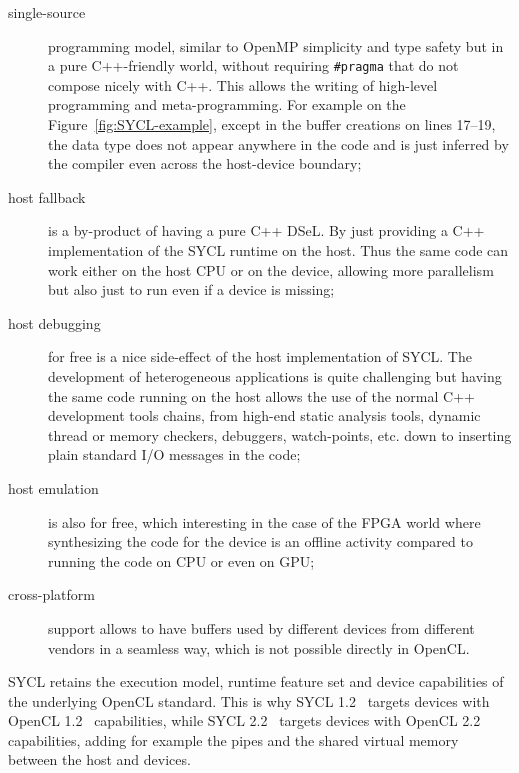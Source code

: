 \documentclass[sigplan]{acmart}
\begin{document}
\begin{description}
\item[single-source] programming model, similar to OpenMP
  simplicity and type safety but in a pure C++-friendly world, without
  requiring \lstinline{#pragma} that do not compose nicely with
  C++. This allows the writing of high-level programming and
  meta-programming. For example on the Figure~\ref{fig:SYCL-example},
  except in the buffer creations on lines 17--19, the data type does
  not appear anywhere in the code and is just inferred by the compiler
  even across the host-device boundary;

\item[host fallback] is a by-product of having a pure C++ DSeL. By
  just providing a C++ implementation of the SYCL runtime on the
  host. Thus the same code can work either on the host CPU or on the
  device, allowing more parallelism but also just to run even if a
  device is missing;

\item[host debugging] for free is a nice side-effect of the host
  implementation of SYCL. The development of heterogeneous
  applications is quite challenging but having the same code running
  on the host allows the use of the normal C++ development tools
  chains, from high-end static analysis tools, dynamic thread or
  memory checkers, debuggers, watch-points, etc.  down to inserting
  plain standard I/O messages in the code;

\item[host emulation] is also for free, which interesting in the case
  of the FPGA world where synthesizing the code for the device
  is an offline activity compared to running the code on CPU or even on GPU;

\item[cross-platform] support allows to have buffers used by different
  devices from different vendors in a seamless way, which is not
  possible directly in OpenCL.


\end{description}

SYCL retains the execution model, runtime feature set and device
capabilities of the underlying OpenCL standard. This is why SYCL
1.2~\cite{SYCL-1.2} targets devices with OpenCL
1.2~\cite{OpenCL-API+C-1.2} capabilities, while SYCL
2.2~\cite{SYCL-2.2-provisional} targets devices with OpenCL
2.2~\cite{OpenCL-API-2.2-provisional} capabilities, adding for example
the pipes and the shared virtual memory between the host and devices.
\end{document}
